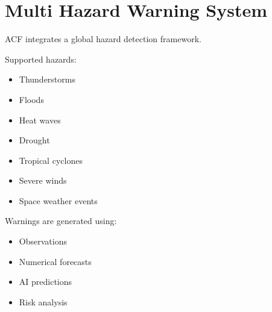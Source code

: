 \section{Multi Hazard Warning System}


ACF integrates a global hazard detection framework.



Supported hazards:


\begin{itemize}

\item Thunderstorms

\item Floods

\item Heat waves

\item Drought

\item Tropical cyclones

\item Severe winds

\item Space weather events

\end{itemize}



Warnings are generated using:


\begin{itemize}

\item Observations

\item Numerical forecasts

\item AI predictions

\item Risk analysis

\end{itemize}
